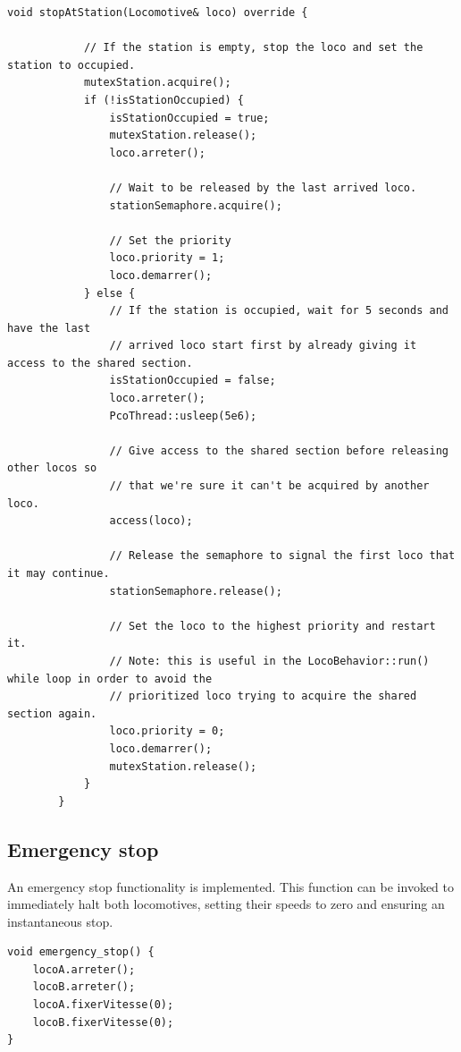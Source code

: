 \documentclass{article}
\begin{document}
    \begin{lstlisting}[caption={The shared section station synchronization routine.}, captionpos=b, label=lst:3]
        void stopAtStation(Locomotive& loco) override {

            // If the station is empty, stop the loco and set the station to occupied.
            mutexStation.acquire();
            if (!isStationOccupied) {
                isStationOccupied = true;
                mutexStation.release();
                loco.arreter();

                // Wait to be released by the last arrived loco.
                stationSemaphore.acquire();

                // Set the priority
                loco.priority = 1;
                loco.demarrer();
            } else {
                // If the station is occupied, wait for 5 seconds and have the last
                // arrived loco start first by already giving it access to the shared section.
                isStationOccupied = false;
                loco.arreter();
                PcoThread::usleep(5e6);

                // Give access to the shared section before releasing other locos so
                // that we're sure it can't be acquired by another loco.
                access(loco);

                // Release the semaphore to signal the first loco that it may continue.
                stationSemaphore.release();

                // Set the loco to the highest priority and restart it.
                // Note: this is useful in the LocoBehavior::run() while loop in order to avoid the
                // prioritized loco trying to acquire the shared section again.
                loco.priority = 0;
                loco.demarrer();
                mutexStation.release();
            }
        }
    \end{lstlisting}

    \subsection{Emergency stop}

    An emergency stop functionality is implemented. This function can be invoked to immediately halt both locomotives, setting their speeds to zero and ensuring an instantaneous stop.

    \begin{lstlisting}[caption={The emergenty stop routine.}, captionpos=b, label=lst:4]
void emergency_stop() {
    locoA.arreter();
    locoB.arreter();
    locoA.fixerVitesse(0);
    locoB.fixerVitesse(0);
}
    \end{lstlisting}
\end{document}

